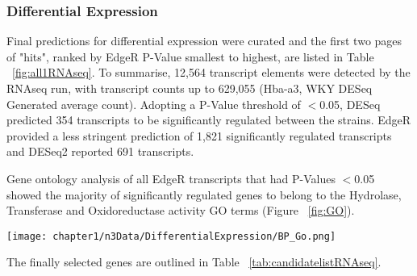 \subsubsection{Differential Expression} \label{chapter1diffexp}

Final predictions for differential expression were curated and the first two pages of "hits", ranked by EdgeR P-Value smallest to highest, are listed in Table ~\ref{fig:all1RNAseq}. To summarise, 12,564 transcript elements were detected by the RNAseq run, with transcript counts up to 629,055 (Hba-a3, WKY DESeq Generated average count). Adopting a P-Value threshold of $<$0.05, DESeq predicted 354 transcripts to be significantly regulated between the strains. EdgeR provided a less stringent prediction of 1,821 significantly regulated transcripts and DESeq2 reported 691 transcripts.

Gene ontology analysis of all EdgeR transcripts that had P-Values $<$0.05 showed the majority of significantly regulated genes to belong to the Hydrolase, Transferase and Oxidoreductase activity GO terms (Figure ~\ref{fig:GO}). 

\begin{figure*}[!hbtp]
\centering
\texttt{[image: chapter1/n3Data/DifferentialExpression/BP\_Go.png]}
\caption[Molecular Function Gene Ontology analysis of EdgeR Significant Transcripts in the Blood]{Molecular Function Gene Ontology analysis of EdgeR Significant (P-Value$<$0.05) Transcripts in the Blood.}
\label{fig:GO}
\end{figure*}

The finally selected genes are outlined in Table ~\ref{tab:candidatelistRNAseq}. 


